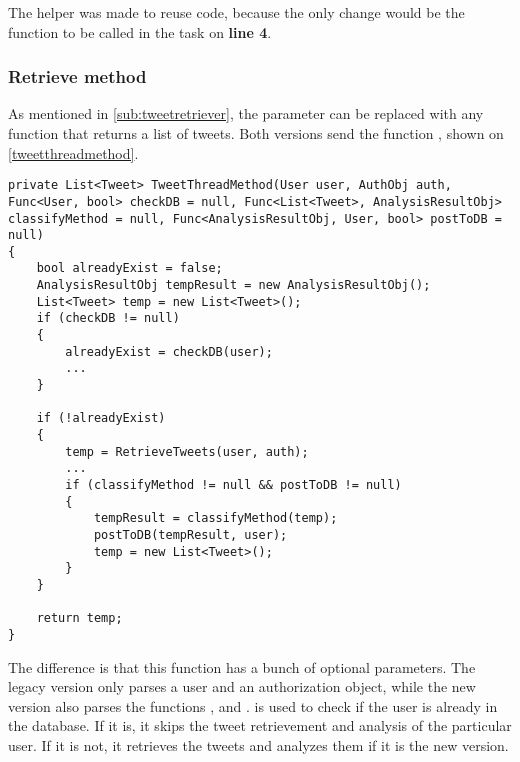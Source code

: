 The helper was made to reuse code, because the only change would be the function to be
called in the task on \textbf{line 4}.\\

\subsubsection{Retrieve method}
As mentioned in \autoref{sub:tweetretriever}, the 
parameter can be replaced with any function that returns a list of tweets. Both
versions send the function , shown on
\autoref{tweetthreadmethod}. \\

\begin{minipage}[H]{\linewidth}
\begin{lstlisting}[caption = The TweetThreadMethod function, label =
tweetthreadmethod]
private List<Tweet> TweetThreadMethod(User user, AuthObj auth, Func<User, bool> checkDB = null, Func<List<Tweet>, AnalysisResultObj> classifyMethod = null, Func<AnalysisResultObj, User, bool> postToDB = null)
{
    bool alreadyExist = false;
    AnalysisResultObj tempResult = new AnalysisResultObj();
    List<Tweet> temp = new List<Tweet>();
    if (checkDB != null)
    {
        alreadyExist = checkDB(user);
		...
    }

    if (!alreadyExist)
    {
        temp = RetrieveTweets(user, auth);
		...	
        if (classifyMethod != null && postToDB != null)
        {
            tempResult = classifyMethod(temp); 
            postToDB(tempResult, user); 
            temp = new List<Tweet>();
        }
    }

    return temp;
}
\end{lstlisting}

\end{minipage}
The difference is that this function has a bunch of optional parameters. The
legacy version only parses a user and an authorization object, while the new
version also parses the functions ,  and
.
 is used to check if the user is already in the database. If it
is, it skips the tweet retrievement and analysis of the particular user. If it
is not, it retrieves the tweets and analyzes them if it is the new version.\\

